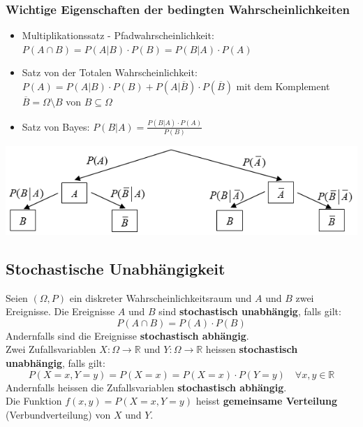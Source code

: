 \subsubsection{Wichtige Eigenschaften der bedingten Wahrscheinlichkeiten}
\label{sec:wichtige-eigenschaften-der-bedingten-wahrscheinlichkeiten}
\begin{itemize}
    \item Multiplikationssatz - Pfadwahrscheinlichkeit: $P(A \cap B) = P(A|B) \cdot P(B) = P(B|A) \cdot P(A)$
    \item Satz von der Totalen Wahrscheinlichkeit: $P(A) = P(A|B) \cdot P(B) + P(A|\overline{B}) \cdot P(\overline{B})$
        mit dem Komplement $\overline{B} = \Omega \setminus B$ von $B \subseteq \Omega$
    \item Satz von Bayes: $P(B|A) = \frac{P(B|A) \cdot P(A)}{P(B)}$
\end{itemize}
\begin{center}
    \includegraphics[width=1\linewidth]{images/Wahrscheinlichkeitsbaum.png}
\end{center}
\subsection{Stochastische Unabhängigkeit}
\label{sec:stochastische-unabhngigkeit}
Seien $(\Omega, P)$ ein diskreter Wahrscheinlichkeitsraum und $A$ und $B$ zwei Ereignisse.
Die Ereignisse $A$ und $B$ sind \textbf{stochastisch unabhängig}, falls gilt:
\begin{equation*}
    P(A \cap B) = P(A) \cdot P(B)
\end{equation*}
Andernfalls sind die Ereignisse \textbf{stochastisch abhängig}. \\
Zwei Zufallsvariablen $X: \Omega \rightarrow \mathbb{R}$ und $Y: \Omega \rightarrow \mathbb{R}$ 
heissen \textbf{stochastisch unabhängig}, falls gilt:
\begin{equation*}
    P(X=x, Y=y) = P(X=x) = P(X=x) \cdot P(Y=y) \quad \forall x, y \in \mathbb{R}
\end{equation*}
Andernfalls heissen die Zufallsvariablen \textbf{stochastisch abhängig}. \\
Die Funktion $f(x, y) = P(X=x, Y=y)$ heisst \textbf{gemeinsame Verteilung} (Verbundverteilung) von $X$ und $Y$.
